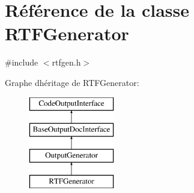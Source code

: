 \hypertarget{class_r_t_f_generator}{}\section{Référence de la classe R\+T\+F\+Generator}
\label{class_r_t_f_generator}


{\ttfamily \#include $<$rtfgen.\+h$>$}

Graphe d\textquotesingle{}héritage de R\+T\+F\+Generator\+:\begin{figure}[H]
\begin{center}
\leavevmode
\includegraphics[height=4.000000cm]{class_r_t_f_generator}
\end{center}
\end{figure}
